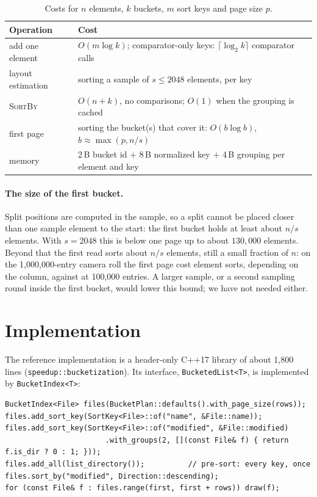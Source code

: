 \documentclass[11pt]{article}
\theoremstyle{definition}
\begin{document}
\begin{table}[t]
\centering
\caption{Costs for $n$ elements, $k$ buckets, $m$ sort keys and page size $p$.}
\label{tab:costs}
\begin{tabular}{ll}
\toprule
Operation & Cost\\
\midrule
add one element & $O(m \log k)$; comparator-only keys: $\lceil\log_2 k\rceil$ comparator calls\\
layout estimation & sorting a sample of $s \le 2048$ elements, per key\\
\textsc{SortBy} & $O(n + k)$, no comparisons; $O(1)$ when the grouping is cached\\
first page & sorting the bucket(s) that cover it: $O(b \log b)$, $b \approx \max(p, n/s)$\\
memory & 2\,B bucket id $+$ 8\,B normalized key $+$ 4\,B grouping per element and key\\
\bottomrule
\end{tabular}
\end{table}

\paragraph{The size of the first bucket.} Split positions are computed in
the sample, so a split cannot be placed closer than one sample element to the
start: the first bucket holds at least about $n/s$ elements. With $s=2048$ this
is below one page up to about $130{,}000$ elements. Beyond that the first read
sorts about $n/s$ elements, still a small fraction of $n$: on the
1{,}000{,}000-entry camera roll the first page cost
 element sorts, depending on the column, against
 at 100{,}000 entries. A larger sample, or a second
sampling round inside the first bucket, would lower this bound; we have not
needed either.

\section{Implementation}\label{sec:impl}

The reference implementation is a header-only C++17 library of about 1{,}800
lines (\texttt{speedup::bucketization}). Its interface,
\texttt{BucketedList<T>}, is implemented by \texttt{BucketIndex<T>}:

\begin{verbatim}
BucketIndex<File> files(BucketPlan::defaults().with_page_size(rows));
files.add_sort_key(SortKey<File>::of("name", &File::name));
files.add_sort_key(SortKey<File>::of("modified", &File::modified)
                       .with_groups(2, [](const File& f) { return f.is_dir ? 0 : 1; }));
files.add_all(list_directory());          // pre-sort: every key, once
files.sort_by("modified", Direction::descending);
for (const File& f : files.range(first, first + rows)) draw(f);
\end{verbatim}
\end{document}
